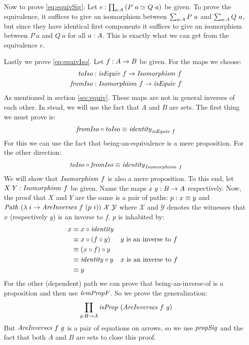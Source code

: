 Now to prove \ref{eq:equivSig}: Let $e \mathrel{:} \prod_{a \mathrel{:} A} \left( P\ a \simeq
Q\ a \right)$ be given. To prove the equivalence, it suffices to give an
isomorphism between $\sum_{a \tp A} P\ a$ and $\sum_{a \mathrel{:} A} Q\ a$, but since
they have identical first components it suffices to give an isomorphism between
$P\ a$ and $Q\ a$ for all $a \mathrel{:} A$. This is exactly what we can get from
the equivalence $e$.\QED

Lastly we prove \ref{eq:equivIso}. Let $f \mathrel{:} A \to B$ be given. For the maps we
choose:
%
\begin{align*}
\mathit{toIso}
  & \mathrel{:} \mathit{isEquiv}\ f             \to \mathit{Isomorphism}\ f \\
\mathit{fromIso}
  & \mathrel{:} \mathit{Isomorphism}\ f \to \mathit{isEquiv}\ f
\end{align*}
%
As mentioned in section \ref{sec:equiv}. These maps are not in general inverses
of each other. In stead, we will use the fact that $A$ and $B$ are sets. The first thing we must prove is:
%
\begin{align*}
  \mathit{fromIso} \circ \mathit{toIso} \equiv \mathit{identity}_{\mathit{isEquiv}\ f}
\end{align*}
%
For this we can use the fact that being-an-equivalence is a mere proposition.
For the other direction:
%
\begin{align*}
  \var{toIso} \comp \var{fromIso} \equiv \identity_{\var{Isomorphism}\ f}
\end{align*}
%
We will show that $\mathit{Isomorphism}\ f$ is also a mere proposition. To this
end, let $X\;Y \mathrel{:} \mathit{Isomorphism}\ f$ be given. Name the maps $x\;y \mathrel{:} B
\to A$ respectively. Now, the proof that $X$ and $Y$ are the same is a pair of
paths: $p \mathrel{:} x \equiv y$ and $\mathit{Path}\ (\lambda\; i \to
\mathit{AreInverses}\ f\ (p\ i))\ \mathcal{X}\ \mathcal{Y}$ where $\mathcal{X}$
and $\mathcal{Y}$ denotes the witnesses that $x$ (respectively $y$) is an
inverse to $f$. $p$ is inhabited by:
%
\begin{align*}
  x
  & \equiv x \circ \mathit{identity} \\
  & \equiv x \circ (f \circ y)
  && \text{$y$ is an inverse to $f$} \\
  & \equiv (x \circ f) \circ y \\
  & \equiv \mathit{identity} \circ y
  && \text{$x$ is an inverse to $f$} \\
  & \equiv y
\end{align*}
%
For the other (dependent) path we can prove that being-an-inverse-of is a
proposition and then use $\mathit{lemPropF}$. So we prove the generalization:
%
\begin{align}
\label{eq:propAreInversesGen}
\prod_{g \mathrel{:} B \to A} \mathit{isProp}\ (\mathit{AreInverses}\ f\ g)
\end{align}
%
But $\var{AreInverses}\ f\ g$ is a pair of equations on arrows, so we use
$\mathit{propSig}$ and the fact that both $A$ and $B$ are sets to close this proof.

